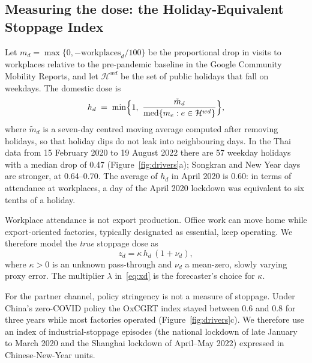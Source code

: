 \documentclass{article}
\theoremstyle{plain}
\theoremstyle{definition}
\theoremstyle{remark}
\begin{document}
\subsection{Measuring the dose: the Holiday-Equivalent Stoppage Index}
Let $m_d=\max\{0,-\text{workplaces}_d/100\}$ be the proportional drop in visits to workplaces relative to the pre-pandemic baseline in the Google Community Mobility Reports, and let $\mathcal{H}^{wd}$ be the set of public holidays that fall on weekdays. The domestic dose is
\begin{equation}\label{eq:hesi}
h_d \;=\; \min\Bigl\{1,\ \frac{\tilde m_d}{\operatorname{med}\{m_e: e\in\mathcal{H}^{wd}\}}\Bigr\},
\end{equation}
where $\tilde m_d$ is a seven-day centred moving average computed after removing holidays, so that holiday dips do not leak into neighbouring days. In the Thai data from 15 February 2020 to 19 August 2022 there are 57 weekday holidays with a median drop of 0.47 (Figure~\ref{fig:drivers}a); Songkran and New Year days are stronger, at 0.64--0.70. The average of $h_d$ in April 2020 is 0.60: in terms of attendance at workplaces, a day of the April 2020 lockdown was equivalent to six tenths of a holiday.

Workplace attendance is not export production. Office work can move home while export-oriented factories, typically designated as essential, keep operating. We therefore model the \emph{true} stoppage dose as
\begin{equation}\label{eq:measurement}
z_d = \kappa\, h_d\,(1+\nu_d),
\end{equation}
where $\kappa>0$ is an unknown pass-through and $\nu_d$ a mean-zero, slowly varying proxy error. The multiplier $\lambda$ in~\eqref{eq:xd} is the forecaster's choice for $\kappa$.

For the partner channel, policy stringency is not a measure of stoppage. Under China's zero-COVID policy the OxCGRT index stayed between 0.6 and 0.8 for three years while most factories operated (Figure~\ref{fig:drivers}c). We therefore use an index of industrial-stoppage episodes (the national lockdown of late January to March 2020 and the Shanghai lockdown of April--May 2022) expressed in Chinese-New-Year units.
\end{document}
